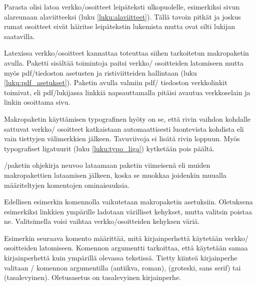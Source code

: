 Parasta olisi latoa verkko\-/osoitteet leipäteksti ulkopuolelle,
esimerkiksi sivun alareunaan alaviitteeksi (luku
\ref{luku:alaviitteet}). Tällä tavoin pitkät ja joskus rumat osoitteet
eivät häiritse leipätekstin lukemista mutta ovat silti lukijan
saatavilla.

Latexissa verkko\-/osoitteet kannattaa toteuttaa siihen tarkoitetun
makropaketin avulla. Paketti 
sisältää toimintoja paitsi verkko\-/ osoitteiden latomiseen mutta myös
pdf\-/tiedoston asetusten ja ristiviitteiden hallintaan (luku
\ref{luku:pdf_asetukset}). Paketin avulla valmiin pdf\-/ tiedoston
verkkolinkit toimivat, eli pdf\-/lukijassa linkkiä napsauttamalla
pitäisi avautua verkkoselain ja linkin osoittama sivu.

Makropaketin käyttämisen typografinen hyöty on se, että rivin vaihdon
kohdalle sattuvat verkko\-/ osoitteet katkaistaan automaattisesti
luontevista kohdista eli vain tiettyjen välimerkkien jälkeen.
Tavuviivoja ei lisätä rivin loppuun. Myös typografiset ligatuurit (luku
\ref{luku:typo_liga}) kytketään pois päältä.

\-/paketin ohjekirja neuvoo lataamaan paketin
viimeisenä eli muiden makropakettien lataamisen jälkeen, koska se
muokkaa joidenkin muualla määriteltyjen komentojen ominaisuuksia.

\begin{koodilohkosis}
  \usepackage{hyperref}  %
  \hypersetup{hidelinks} %
\end{koodilohkosis}

Edellisen esimerkin komennolla  vaikutetaan
makropaketin asetuksiin. Oletuksena esimerkiksi linkkien ympärille
ladotaan värilliset kehykset, mutta valitsin  poistaa
ne. Valitsimella  voisi vaihtaa verkko\-/osoitteiden
kehyksen väriä.

Esimerkin seuraava komento  määrittää, mitä
kirjainperhettä käytetään verkko\-/ osoitteiden latomiseen. Komennon
argumentti  tarkoittaa, että käytetään samaa kirjainperhettä
kuin ympärillä olevassa tekstissä. Tietty kiinteä kirjainperhe valitaan
\-/ komennon argumentilla  (antiikva,
roman),  (groteski, sans serif) tai  (tasalevyinen).
Oletusasetus on tasalevyinen kirjainperhe.

